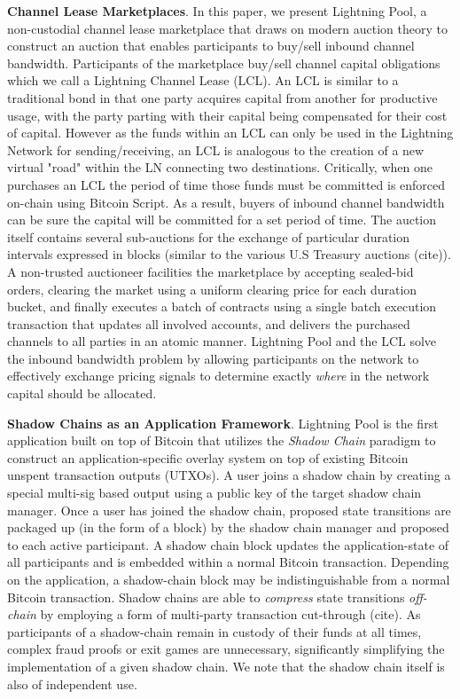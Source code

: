 \documentclass[12pt,a4paper]{article}
\theoremstyle{definition}
\begin{document}
\textbf{Channel Lease Marketplaces}. In this paper, we present Lightning Pool,
a non-custodial channel lease marketplace that draws on modern auction theory
to construct an auction that enables participants to buy/sell inbound channel
bandwidth. Participants of the marketplace buy/sell channel capital obligations
which we call a Lightning Channel Lease (LCL). An LCL is similar to a
traditional bond in that one party acquires capital from another for productive
usage, with the party parting with their capital being compensated for their
cost of capital. However as the funds within an LCL can only be used in the
Lightning Network for sending/receiving, an LCL is analogous to the creation of
a new virtual "road" within the LN connecting two destinations. Critically,
when one purchases an LCL the period of time those funds must be committed is
enforced on-chain using Bitcoin Script. As a result, buyers of inbound channel
bandwidth can be sure the capital will be committed for a set period of time.
The auction itself contains several sub-auctions for the exchange of particular
duration intervals expressed in blocks (similar to the various U.S Treasury
auctions (cite)). A non-trusted auctioneer facilities the marketplace by
accepting sealed-bid orders, clearing the market using a uniform clearing price
for each duration bucket, and finally executes a batch of contracts using a
single batch execution transaction that updates all involved accounts, and
delivers the purchased channels to all parties in an atomic manner. Lightning
Pool and the LCL solve the inbound bandwidth problem by allowing participants
on the network to effectively exchange pricing signals to determine exactly
\emph{where} in the network capital should be allocated.


\textbf{Shadow Chains as an Application Framework}. Lightning Pool is the first
application built on top of Bitcoin that utilizes the \emph{Shadow Chain}
paradigm to construct an application-specific overlay system on top of existing
Bitcoin unspent transaction outputs (UTXOs). A user joins a shadow chain by
creating a special multi-sig based output using a public key of the target
shadow chain manager. Once a user has joined the shadow chain, proposed state
transitions are packaged up (in the form of a block) by the shadow chain
manager and proposed to each active participant. A shadow chain block updates
the application-state of all participants and is embedded within a normal
Bitcoin transaction. Depending on the application, a shadow-chain block may be
indistinguishable from a normal Bitcoin transaction. Shadow chains are able to
\emph{compress} state transitions \emph{off-chain} by employing a form of
multi-party transaction cut-through (cite). As participants of a shadow-chain
remain in custody of their funds at all times, complex fraud proofs or exit
games are unnecessary, significantly simplifying the implementation of a given
shadow chain. We note that the shadow chain itself is also of independent use.
\end{document}
